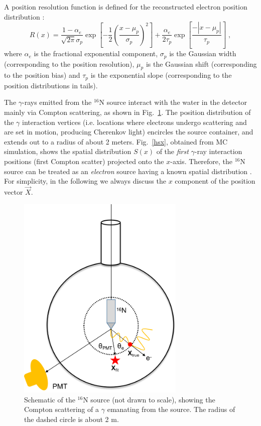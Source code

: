 A position resolution function is defined for the reconstructed electron position distribution \cite{boulay2004direct}:
\begin{equation}
R(x)=\frac{1-\alpha_e}{\sqrt{2\pi}\sigma_p}\exp{[-\frac{1}{2}(\frac{x-\mu_p}{\sigma_p})^2]+\frac{\alpha_e}{2\tau_p}\exp{[\frac{-|x-\mu_p|}{\tau_p}]}}\;,
\end{equation}
where $\alpha_e$ is the fractional exponential component, $\sigma_p$ is the Gaussian width (corresponding to the position resolution), $\mu_p$ is the Gaussian shift (corresponding to the position bias) and $\tau_p$ is the exponential slope (corresponding to the position distributions in tails).

The $\gamma$-rays emitted from the $^{16}$N source interact with the water in the detector mainly via Compton scattering, as shown in Fig.~\ref{N16centralDiagram}. The position distribution of the $\gamma$ interaction vertices (i.e. locations where electrons undergo scattering and are set in motion, producing Cherenkov light) encircles the source container, and extends out to a radius of about 2 meters. Fig.~\ref{hsx}, obtained from MC simulation, shows the spatial distribution $S(x)$ of the {\em first} $\gamma$-ray interaction positions (first Compton scatter) projected onto the $x$-axis. Therefore, the $^{16}$N source can be treated as an {\em electron} source having a known spatial distribution \cite{boulay2004direct}. For simplicity, in the following we always discuss the $x$ component of the position vector $\vec{X}$. 

\begin{figure}[!htb]
	\centering
	\includegraphics[width=8cm]{N16centralDiagram.png}
	\caption[Schematic of the $^{16}$N source.]{Schematic of the $^{16}$N source (not drawn to scale), showing the Compton scattering of a $\gamma$ emanating from the source. The radius of the dashed circle is about 2 m.	\label{N16centralDiagram}}
\end{figure}

